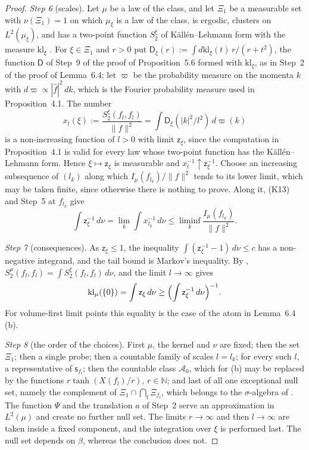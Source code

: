 \documentclass[11pt,letterpaper,reqno]{amsart}
\theoremstyle{definition}
\begin{document}
\begin{proof}
\emph{Step 6} (scales).
Let $\mu$ be a law of the class, and let $\Xi_1$ be a measurable set with $\nu(\Xi_1)=1$ on which $\mu_\xi$ is a law of the class, is ergodic, clusters on $L^2(\mu_\xi)$, and has a two-point function $S_2^\xi$ of K\"all\'en--Lehmann form with the measure $\mathrm{kl}_\xi$ \cite[Theorem~1.3\,(b)(v); Theorem~1.4, Part~I\,(d)--(f)]{QEDII}.
For $\xi\in\Xi_1$ and $r>0$ put $\mathsf D_\xi(r):=\int d\mathrm{kl}_\xi(t)\,r/(r+t^2)$, the function $\mathsf D$ of Step~9 of the proof of Proposition~5.6 formed with $\mathrm{kl}_\xi$, as in Step~2 of the proof of Lemma~6.4;
let $\varpi$ be the probability measure on the momenta $k$ with $d\varpi\propto|\hat f|^2\,dk$, which is the Fourier probability measure used in Proposition~4.1.
The number
\begin{equation*}
x_l(\xi):=\frac{S_2^\xi(f_l,f_l)}{\|f\|^2}=\int\mathsf D_\xi(|k|^2/l^2)\,d\varpi(k)
\end{equation*}
is a non-increasing function of $l>0$ with limit $\mathsf z_\xi$, since the computation in Proposition~4.1 is valid for every law whose two-point function has the K\"all\'en--Lehmann form.
Hence $\xi\mapsto\mathsf z_\xi$ is measurable and $x_l^{-1}\uparrow\mathsf z_\xi^{-1}$.
Choose an increasing subsequence of $(l_k)$ along which $I_\mu(f_{l_k})/\|f\|^2$ tends to its lower limit, which may be taken finite, since otherwise there is nothing to prove.
Along it, (K13) and Step~5 at $f_{l_k}$ give
\begin{equation*}
\int\mathsf z_\xi^{-1}\,d\nu=\lim_k\int x_{l_k}^{-1}\,d\nu\le\liminf_k\frac{I_\mu(f_{l_k})}{\|f\|^2}.
\end{equation*}

\emph{Step 7} (consequences).
As $\mathsf z_\xi\le1$, the inequality $\int(\mathsf z_\xi^{-1}-1)\,d\nu\le c$ has a non-negative integrand, and the tail bound is Markov's inequality.
By \cite[Proposition~45.6\,(a$'$)]{QEDIII}, $S_2^\mu(f_l,f_l)=\int S_2^\xi(f_l,f_l)\,d\nu$, and the limit $l\to\infty$ gives
\begin{equation*}
\mathrm{kl}_\mu(\{0\})=\int\mathsf z_\xi\,d\nu\ge\Bigl(\int\mathsf z_\xi^{-1}\,d\nu\Bigr)^{-1}.
\end{equation*}
For volume-first limit points this equality is the case of the atom in Lemma~6.4\,(b).

\emph{Step 8} (the order of the choices).
First $\mu$, the kernel and $\nu$ are fixed;
then the set $\Xi_1$;
then a single probe;
then a countable family of scales $l=l_k$;
for every such $l$, a representative of $\mathsf s_{f_l}$;
then the countable class $\mathcal A_0$, which for (b) may be replaced by the functions $r\tanh(X(f_l)/r)$, $r\in\mathbb N$;
and last of all one exceptional null set, namely the complement of $\Xi_1\cap\bigcap_l\Xi_{f_l}$, which belongs to the $\sigma$-algebra of \cite[(n7)]{QEDIII}.
The function $\Psi$ and the translation $a$ of Step~2 serve an approximation in $L^2(\mu)$ and create no further null set.
The limits $r\to\infty$ and then $l\to\infty$ are taken inside a fixed component, and the integration over $\xi$ is performed last.
The null set depends on $\beta$, whereas the conclusion does not.
\end{proof}
\end{document}
